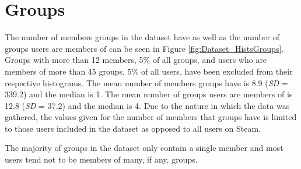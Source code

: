 \section{Groups} \label{sec:Dataset_Groups}

The number of members groups in the dataset have as well as the number of groups users are members of can be seen in Figure \ref{fig:Dataset_HistsGroups}. Groups with more than 12 members, 5\% of all groups, and users who are members of more than 45 groups, 5\% of all users, have been excluded from their respective histograms. The mean number of members groups have is 8.9 (\textit{SD} = 339.2) and the median is 1. The mean number of groups users are members of is 12.8 (\textit{SD} = 37.2) and the median is 4. Due to the nature in which the data was gathered, the values given for the number of members that groups have is limited to those users included in the dataset as opposed to all users on Steam.

The majority of groups in the dataset only contain a single member and most users tend not to be members of many, if any, groups.

